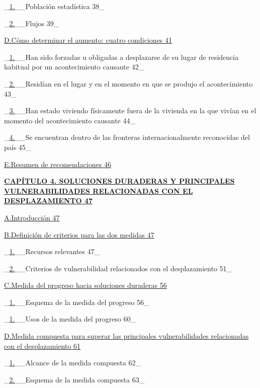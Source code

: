 \documentclass[
]{book}
\begin{document}
\_\protect\hyperlink{_Toc71834761}{1.}\_\_Población estadística 38\_

\_\protect\hyperlink{_Toc71834762}{2.}\_\_Flujos 39\_

\protect\hyperlink{_Toc71834763}{D.Cómo determinar el aumento: cuatro condiciones 41}

\_\protect\hyperlink{_Toc71834764}{1.}\_\_Han sido forzadas u obligadas a desplazarse de su lugar de residencia habitual por un acontecimiento causante 42\_

\_\protect\hyperlink{_Toc71834765}{2.}\_\_Residían en el lugar y en el momento en que se produjo el acontecimiento 43\_

\_\protect\hyperlink{_Toc71834766}{3.}\_\_Han estado viviendo físicamente fuera de la vivienda en la que vivían en el momento del acontecimiento causante 44\_

\_\protect\hyperlink{_Toc71834767}{4.}\_\_Se encuentran dentro de las fronteras internacionalmente reconocidas del país 45\_

\protect\hyperlink{_Toc71834768}{E.Resumen de recomendaciones 46}

\textbf{\protect\hyperlink{_Toc71834769}{CAPÍTULO 4. SOLUCIONES DURADERAS Y PRINCIPALES VULNERABILIDADES RELACIONADAS CON EL DESPLAZAMIENTO 47}}

\protect\hyperlink{_Toc71834770}{A.Introducción 47}

\protect\hyperlink{_Toc71834771}{B.Definición de criterios para las dos medidas 47}

\_\protect\hyperlink{_Toc71834772}{1.}\_\_Recursos relevantes 47\_

\_\protect\hyperlink{_Toc71834773}{2.}\_\_Criterios de vulnerabilidad relacionados con el desplazamiento 51\_

\protect\hyperlink{_Toc71834774}{C.Medida del progreso hacia soluciones duraderas 56}

\_\protect\hyperlink{_Toc71834775}{1.}\_\_Esquema de la medida del progreso 56\_

\_\protect\hyperlink{_Toc71834776}{1.}\_\_Usos de la medida del progreso 60\_

\protect\hyperlink{_Toc71834777}{D.Medida compuesta para superar las principales vulnerabilidades relacionadas con el desplazamiento 61}

\_\protect\hyperlink{_Toc71834778}{1.}\_\_Alcance de la medida compuesta 62\_

\_\protect\hyperlink{_Toc71834779}{2.}\_\_Esquema de la medida compuesta 63\_
\end{document}
